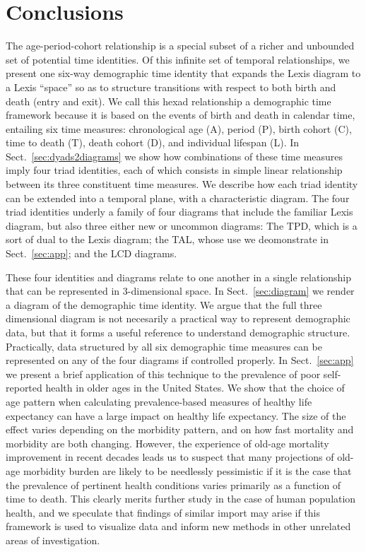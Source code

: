\documentclass{bmcart}
\theoremstyle{definition}
\begin{document}
\section{Conclusions}
The age-period-cohort relationship is a special subset of a richer and unbounded
set of potential time identities. Of this infinite set of
temporal relationships, we present one six-way demographic time
identity that expands the Lexis diagram to a Lexis ``space'' so as to structure
transitions with respect to both birth and death (entry and exit). We call this
hexad relationship a demographic time framework because it is based on
the events of birth and death in calendar time, entailing six time measures:
chronological age (A), period (P), birth cohort (C), time to death (T), death cohort (D), and individual lifespan (L). In
Sect.~\ref{sec:dyads2diagrams} we show how combinations of these time measures imply four triad identities, each of which consists in simple linear relationship between its three
constituent time measures. We describe how each triad identity can be
extended into a temporal plane, with a characteristic diagram. The four triad
identities underly a family of four diagrams that include the
familiar Lexis diagram, but also three either new or
uncommon diagrams: The TPD, which is a sort of dual to the Lexis diagram; the TAL, whose use we deomonstrate in Sect.~\ref{sec:app}; and the LCD diagrams.

These four identities and diagrams relate to one another in a single
relationship that can be represented in 3-dimensional space. 
In Sect.~\ref{sec:diagram} we render a diagram of the demographic time
identity. We argue that the full three dimensional diagram is not necesarily a
practical way to represent demographic data, but that it forms a useful
reference to understand demographic structure. Practically, data structured by
all six demographic time measures can be represented on any of the four diagrams
if controlled properly. In Sect.~\ref{sec:app} we present a brief
application of this technique to the prevalence of poor self-reported health in
older ages in the United States.  We show that the choice of age pattern when calculating
prevalence-based measures of healthy life expectancy can have a large impact on
healthy life expectancy. The size of the effect varies depending on the morbidity pattern, and on how fast mortality and
morbidity are both changing. However, the experience of old-age mortality
improvement in recent decades leads us to suspect that many projections of
old-age morbidity burden are likely to be needlessly pessimistic if it is the
case that the prevalence of pertinent health conditions varies primarily as a
function of time to death. This clearly merits further study in the case of human population
health, and we speculate that findings of similar import may arise if
this framework is used to visualize data and inform new methods in other
unrelated areas of investigation.
\end{document}
